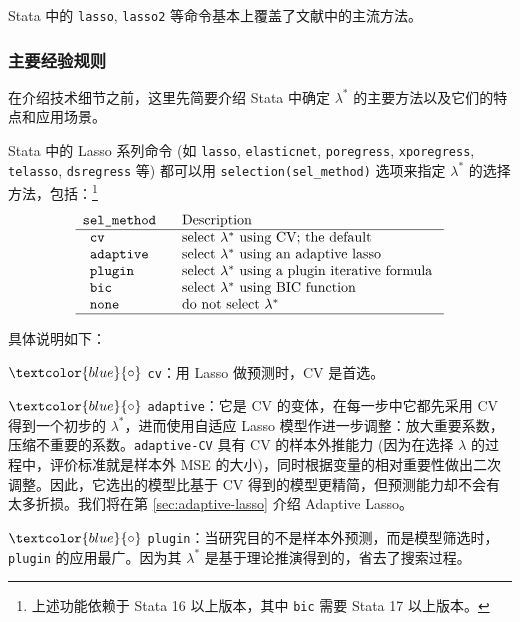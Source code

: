 Stata 中的 \texttt{lasso}, \texttt{lasso2} 等命令基本上覆盖了文献中的主流方法。
\subsubsection{主要经验规则}


在介绍技术细节之前，这里先简要介绍 Stata 中确定 $\lambda^*$ 的主要方法以及它们的特点和应用场景。

Stata 中的 Lasso 系列命令 (如 \texttt{lasso}, \texttt{elasticnet}, \texttt{poregress}, \texttt{xporegress}, \texttt{telasso}, \texttt{dsregress} 等) 都可以用 \texttt{selection(sel\_method)} 选项来指定 $\lambda^*$ 的选择方法，包括：\footnote{上述功能依赖于 Stata 16 以上版本，其中 \texttt{bic} 需要 Stata 17 以上版本。}
$$
\vspace{-3pt}
\begin{array}{ll}
\texttt{sel\_method } & \text { Description } \\
\hline \texttt{ cv} & \text { select $\lambda^*$ using CV; the default } \\
\texttt { adaptive } & \text { select $\lambda^*$ using an adaptive lasso } \\
\texttt { plugin} & \text { select $\lambda^*$ using a plugin iterative formula } \\
\texttt { bic} & \text { select $\lambda^*$ using BIC function } \\
\texttt { none } & \text { do not select $\lambda^*$ } \\
\hline 
\end{array}
$$

\vspace{10pt}
具体说明如下：

$\textcolor{blue}{\circ}$ \texttt{cv}：用 Lasso 做预测时，CV 是首选。

$\textcolor{blue}{\circ}$ \texttt{adaptive}：它是 $\mathrm{CV}$ 的变体，在每一步中它都先采用 CV 得到一个初步的 $\lambda^{*}$，进而使用自适应 Lasso 模型作进一步调整：放大重要系数，压缩不重要的系数。\texttt{adaptive-CV} 具有 CV 的样本外推能力 (因为在选择 $\lambda$ 的过程中，评价标准就是样本外 MSE 的大小)，同时根据变量的相对重要性做出二次调整。因此，它选出的模型比基于 CV 得到的模型更精简，但预测能力却不会有太多折损。我们将在第 \ref{sec:adaptive-lasso} 介绍 Adaptive Lasso。

$\textcolor{blue}{\circ}$ \texttt{plugin}：当研究目的不是样本外预测，而是模型筛选时，\texttt{plugin} 的应用最广。因为其 $\lambda^*$ 是基于理论推演得到的，省去了搜索过程。

